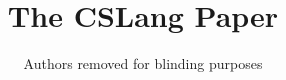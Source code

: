 \documentclass[manuscript]{acmart}
\begin{document}


\title{The CSLang Paper}


\newcommand{\showurlx}{[redacted]}

\author{Authors removed for blinding purposes}

\maketitle


%








{\footnotesize 
}
\end{document}
